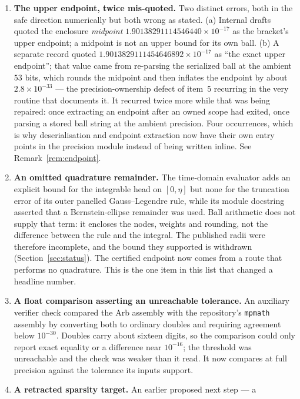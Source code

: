 \documentclass[11pt,a4paper]{article}
\theoremstyle{definition}
\theoremstyle{remark}
\newcommand{\src}[1]{{\footnotesize\texttt{#1}}}
\begin{document}
\begin{enumerate}
{  afterwards does not recover it}: own your inputs as well as your scope.
\item \textbf{The upper endpoint, twice mis-quoted.} Two distinct errors, both
  in the safe direction numerically but both wrong as stated. (a) Internal
  drafts quoted the enclosure \emph{midpoint}
  $1.90138291114546440\times10^{-17}$ as the bracket's upper endpoint; a
  midpoint is not an upper bound for its own ball. (b) A separate record quoted
  $1.9013829111454646892\times10^{-17}$ as ``the exact upper endpoint''; that
  value came from re-parsing the serialized ball at the ambient $53$ bits,
  which rounds the midpoint and then inflates the endpoint by about
  $2.8\times10^{-33}$ --- the precision-ownership defect of item~5 recurring in
  the very routine that documents it. It recurred twice more while that was
  being repaired: once extracting an endpoint after an owned scope had exited,
  once parsing a stored ball string at the ambient precision. Four occurrences,
  which is why deserialisation and endpoint extraction now have their own entry
  points in the precision module instead of being written inline.
  See Remark~\ref{rem:endpoint}.
\item \textbf{An omitted quadrature remainder.} The time-domain evaluator adds
  an explicit bound for the integrable head on $[0,\eta]$ but none for the
  truncation error of its outer panelled Gauss--Legendre rule, while its module
  docstring asserted that a Bernstein-ellipse remainder was used. Ball
  arithmetic does not supply that term: it encloses the nodes, weights and
  rounding, not the difference between the rule and the integral. The published
  radii were therefore incomplete, and the bound they supported is withdrawn
  (Section~\ref{sec:status}). The certified endpoint now comes from a route that
  performs no quadrature. This is the one item in this list that changed a
  headline number.
\item \textbf{A float comparison asserting an unreachable tolerance.} An
  auxiliary verifier check compared the Arb assembly with the repository's
  \src{mpmath} assembly by converting both to ordinary doubles and requiring
  agreement below $10^{-30}$. Doubles carry about sixteen digits, so the
  comparison could only report exact equality or a difference near $10^{-16}$;
  the threshold was unreachable and the check was weaker than it read. It now
  compares at full precision against the tolerance its inputs support.
\item \textbf{A retracted sparsity target.} An earlier proposed next step --- a

\end{enumerate}
\end{document}

